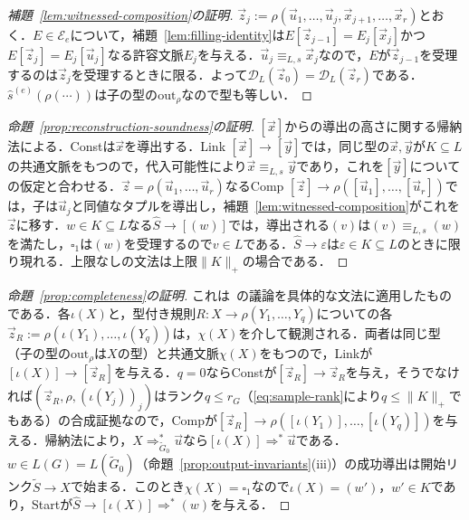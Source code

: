 \documentclass[11pt,a4paper]{ltjsarticle}
\numberwithin{equation}{section}
\theoremstyle{plain}
\theoremstyle{definition}
\theoremstyle{remark}
\newcommand{\D}{\mathcal{D}}
\newcommand{\out}{\mathrm{out}}
\newcommand{\tuple}[1]{\vec{#1}}
\newcommand{\blank}{\square}
\newcommand{\eps}{\varepsilon}
\begin{document}
\begin{proof}[補題~\ref{lem:witnessed-composition}の証明]
$\tuple z_j:=\rho(\tuple u_1,\ldots,\tuple u_j,\tuple x_{j+1},\ldots,\tuple x_r)$とおく．$E\in\mathcal E_e$について，補題~\ref{lem:filling-identity}は$E[\tuple z_{j-1}]=E_j[\tuple x_j]$かつ$E[\tuple z_j]=E_j[\tuple u_j]$なる許容文脈$E_j$を与える．$\tuple u_j\equiv_{L,s}\tuple x_j$なので，$E$が$\tuple z_{j-1}$を受理するのは$\tuple z_j$を受理するときに限る．よって$\D_L(\tuple z_0)=\D_L(\tuple z_r)$である．$\widehat s^{(e)}(\rho(\cdots))$は子の型の$\out_\rho$なので型も等しい．
\end{proof}

\begin{proof}[命題~\ref{prop:reconstruction-soundness}の証明]
$[\tuple x]$からの導出の高さに関する帰納法による．Constは$\tuple x$を導出する．Link $[\tuple x]\to[\tuple y]$では，同じ型の$\tuple x,\tuple y$が$K\subseteq L$の共通文脈をもつので，代入可能性により$\tuple x\equiv_{L,s}\tuple y$であり，これを$[\tuple y]$についての仮定と合わせる．$\tuple z=\rho(\tuple u_1,\ldots,\tuple u_r)$なるComp $[\tuple z]\to\rho([\tuple u_1],\ldots,[\tuple u_r])$では，子は$\tuple u_j$と同値なタプルを導出し，補題~\ref{lem:witnessed-composition}がこれを$\tuple z$に移す．$w\in K\subseteq L$なる$\widehat S\to[(w)]$では，導出される$(v)$は$(v)\equiv_{L,s}(w)$を満たし，$\blank_1$は$(w)$を受理するので$v\in L$である．$\widehat S\to\eps$は$\eps\in K\subseteq L$のときに限り現れる．上限なしの文法は上限$\|K\|_+$の場合である．
\end{proof}

\begin{proof}[命題~\ref{prop:completeness}の証明]
これは~\cite[Lemma~3]{Yoshinaka2015General}の議論を具体的な文法に適用したものである．各$\iota(X)$と，型付き規則$R:X\to\rho(Y_1,\ldots,Y_q)$についての各$\tuple z_R:=\rho(\iota(Y_1),\ldots,\iota(Y_q))$は，$\chi(X)$を介して観測される．両者は同じ型（子の型の$\out_\rho$は$X$の型）と共通文脈$\chi(X)$をもつので，Linkが$[\iota(X)]\to[\tuple z_R]$を与える．$q=0$ならConstが$[\tuple z_R]\to\tuple z_R$を与え，そうでなければ$(\tuple z_R,\rho,(\iota(Y_j))_j)$はランク$q\le r_G$（\eqref{eq:sample-rank}により$q\le\|K\|_+$でもある）の合成証拠なので，Compが$[\tuple z_R]\to\rho([\iota(Y_1)],\ldots,[\iota(Y_q)])$を与える．帰納法により，$X\Rightarrow^*_{\widetilde G_0}\tuple u$なら$[\iota(X)]\Rightarrow^*\tuple u$である．$w\in L(G)=L(\widetilde G_0)$（命題~\ref{prop:output-invariants}(iii)）の成功導出は開始リンク$\widetilde S\to X$で始まる．このとき$\chi(X)=\blank_1$なので$\iota(X)=(w')$，$w'\in K$であり，Startが$\widehat S\to[\iota(X)]\Rightarrow^*(w)$を与える．
\end{proof}
\end{document}
